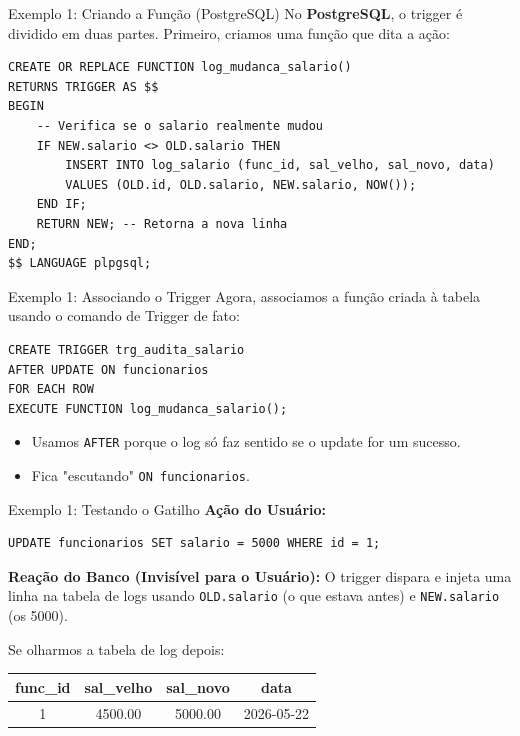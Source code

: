 \documentclass[9pt]{beamer}
\begin{document}
\begin{frame}[fragile]{Exemplo 1: Criando a Função (PostgreSQL)}
    No \textbf{PostgreSQL}, o trigger é dividido em duas partes. Primeiro, criamos uma função que dita a ação:
    
    \begin{lstlisting}
CREATE OR REPLACE FUNCTION log_mudanca_salario()
RETURNS TRIGGER AS $$
BEGIN
    -- Verifica se o salario realmente mudou
    IF NEW.salario <> OLD.salario THEN
        INSERT INTO log_salario (func_id, sal_velho, sal_novo, data)
        VALUES (OLD.id, OLD.salario, NEW.salario, NOW());
    END IF;
    RETURN NEW; -- Retorna a nova linha
END;
$$ LANGUAGE plpgsql;
    \end{lstlisting}
\end{frame}

\begin{frame}[fragile]{Exemplo 1: Associando o Trigger}
    Agora, associamos a função criada à tabela usando o comando de Trigger de fato:
    
    \begin{lstlisting}
CREATE TRIGGER trg_audita_salario
AFTER UPDATE ON funcionarios
FOR EACH ROW
EXECUTE FUNCTION log_mudanca_salario();
    \end{lstlisting}
    
    \begin{itemize}
        \item Usamos \texttt{AFTER} porque o log só faz sentido se o update for um sucesso.
        \item Fica "escutando" \texttt{ON funcionarios}.
    \end{itemize}
\end{frame}

\begin{frame}[fragile]{Exemplo 1: Testando o Gatilho}
    \textbf{Ação do Usuário:}
    \begin{lstlisting}
UPDATE funcionarios SET salario = 5000 WHERE id = 1;
    \end{lstlisting}
    
    \vspace{0.3cm}
    \textbf{Reação do Banco (Invisível para o Usuário):}
    O trigger dispara e injeta uma linha na tabela de logs usando \texttt{OLD.salario} (o que estava antes) e \texttt{NEW.salario} (os 5000).
    
    \vspace{0.3cm}
    Se olharmos a tabela de log depois:
    \begin{center}
        \begin{tabular}{|c|c|c|c|}
            \hline
            \textbf{func\_id} & \textbf{sal\_velho} & \textbf{sal\_novo} & \textbf{data} \\
            \hline
            1 & 4500.00 & 5000.00 & 2026-05-22 \\
            \hline
        \end{tabular}
    \end{center}
\end{frame}
\end{document}
